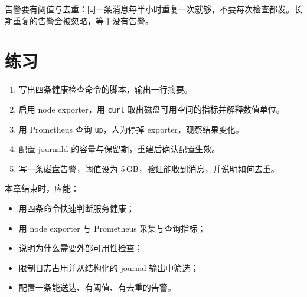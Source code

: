 
告警要有阈值与去重：同一条消息每半小时重复一次就够，不要每次检查都发。长期重复的告警会被忽略，等于没有告警。

\section{练习}

\begin{enumerate}
  \item 写出四条健康检查命令的脚本，输出一行摘要。
  \item 启用 node exporter，用 \texttt{curl} 取出磁盘可用空间的指标并解释数值单位。
  \item 用 Prometheus 查询 \texttt{up}，人为停掉 exporter，观察结果变化。
  \item 配置 journald 的容量与保留期，重建后确认配置生效。
  \item 写一条磁盘告警，阈值设为 5\,GB，验证能收到消息，并说明如何去重。
\end{enumerate}

\begin{checkpoint}
本章结束时，应能：
\begin{itemize}
  \item 用四条命令快速判断服务健康；
  \item 用 node exporter 与 Prometheus 采集与查询指标；
  \item 说明为什么需要外部可用性检查；
  \item 限制日志占用并从结构化的 journal 输出中筛选；
  \item 配置一条能送达、有阈值、有去重的告警。
\end{itemize}
\end{checkpoint}
